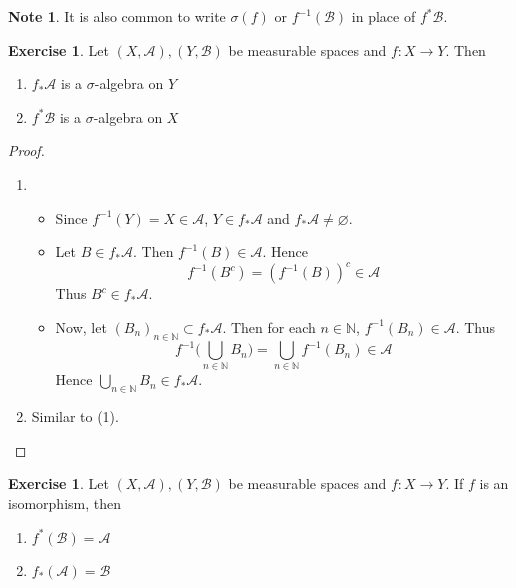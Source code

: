 \documentclass[12pt]{amsart}
\theoremstyle{definition}
\newtheorem{note}[definition]{Note}
\newtheorem{ex}[definition]{Exercise}
\newcommand{\sig}{\sigma}
\newcommand{\N}{\mathbb{N}}
\newcommand{\MA}{\mathcal{A}}
\newcommand{\MB}{\mathcal{B}}
\newcommand{\lex}[1]{\label{ex:#1}}
\begin{document}
	\begin{note}
		It is also common to write $\sig(f)$ or $f^{-1}(\MB)$ in place of $f^*\MB$.
	\end{note}	
	
	\begin{ex} \lex{00000} 
		Let $(X,\MA), (Y,\MB)$ be measurable spaces and $f: X \rightarrow Y$. Then 
		\begin{enumerate}
			\item $f_*\MA$ is a $\sig$-algebra on $Y$
			\item $f^*\MB$ is a $\sig$-algebra on $X$
		\end{enumerate}
	\end{ex}
	
	\begin{proof}\
		\begin{enumerate}
			\item 
			\begin{itemize}
				\item Since $f^{-1}(Y) = X \in \MA$, $Y \in f_*\MA$ and $f_*\MA \neq \varnothing$. 
				\item Let $B \in f_*\MA$. Then $f^{-1}(B) \in \MA$. Hence $$f^{-1}(B^c) = (f^{-1}(B))^c \in \MA$$ Thus $B^c \in f_*\MA$. 
				\item Now, let $(B_n)_{n \in \N} \subset f_*\MA$. Then for each $n \in \N$, $f^{-1}(B_n) \in \MA$. Thus $$f^{-1}\bigg(\bigcup_{n \in \N} B_n \bigg) = \bigcup_{n \in \N} f^{-1}(B_n) \in \MA$$ Hence $\bigcup\limits_{n \in \N} B_n \in f_*\MA$.
			\end{itemize}
			\item Similar to (1).
		\end{enumerate}
	\end{proof}

	\begin{ex}
		Let $(X,\MA), (Y,\MB)$ be measurable spaces and $f: X \rightarrow Y$. If $f$ is an isomorphism, then
		\begin{enumerate}
			\item $f^*(\MB) = \MA$
			\item $f_*(\MA) = \MB$
		\end{enumerate}
	\end{ex}
\end{document}
